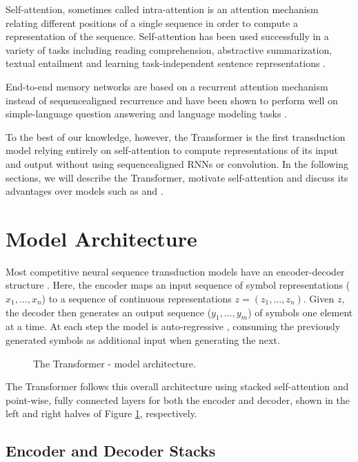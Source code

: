 \documentclass[12pt, a4paper]{article}
\begin{document}
Self-attention, sometimes called intra-attention is an attention mechanism relating different positions of a single sequence in order to compute a representation of the sequence. Self-attention has been used successfully in a variety of tasks including reading comprehension, abstractive summarization, textual entailment and learning task-independent sentence representations \cite{4, 27, 28, 22}.

End-to-end memory networks are based on a recurrent attention mechanism instead of sequencealigned recurrence and have been shown to perform well on simple-language question answering and language modeling tasks \cite{34}.

To the best of our knowledge, however, the Transformer is the first transduction model relying entirely on self-attention to compute representations of its input and output without using sequencealigned RNNs or convolution. In the following sections, we will describe the Transformer, motivate self-attention and discuss its advantages over models such as \cite{17, 18} and \cite{9}.

\section{Model Architecture}

Most competitive neural sequence transduction models have an encoder-decoder structure \cite{5, 2, 35}. Here, the encoder maps an input sequence of symbol representations ($x_1,..., x_n$) to a sequence of continuous representations $z = (z_1,..., z_n)$. Given $z$, the decoder then generates an output sequence ($y_1,..., y_m$) of symbols one element at a time. At each step the model is auto-regressive \cite{10}, consuming the previously generated symbols as additional input when generating the next.

\begin{figure}[H]
\centering
\caption{The Transformer - model architecture.}
\label{fig:transformer}
\end{figure}

The Transformer follows this overall architecture using stacked self-attention and point-wise, fully connected layers for both the encoder and decoder, shown in the left and right halves of Figure \ref{fig:transformer}, respectively.

\subsection{Encoder and Decoder Stacks}
\end{document}

